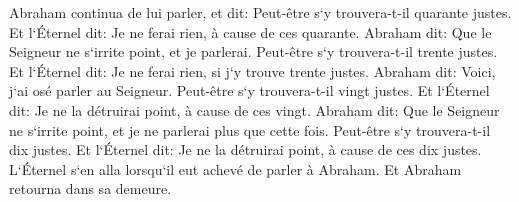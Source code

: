 \verse Abraham continua de lui parler, et dit: Peut-être s`y trouvera-t-il quarante justes. Et l`Éternel dit: Je ne ferai rien, à cause de ces quarante. 
\verse Abraham dit: Que le Seigneur ne s`irrite point, et je parlerai. Peut-être s`y trouvera-t-il trente justes. Et l`Éternel dit: Je ne ferai rien, si j`y trouve trente justes. 
\verse Abraham dit: Voici, j`ai osé parler au Seigneur. Peut-être s`y trouvera-t-il vingt justes. Et l`Éternel dit: Je ne la détruirai point, à cause de ces vingt. 
\verse Abraham dit: Que le Seigneur ne s`irrite point, et je ne parlerai plus que cette fois. Peut-être s`y trouvera-t-il dix justes. Et l`Éternel dit: Je ne la détruirai point, à cause de ces dix justes. 
\verse L`Éternel s`en alla lorsqu`il eut achevé de parler à Abraham. Et Abraham retourna dans sa demeure. 

\chapter{}

